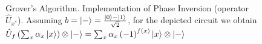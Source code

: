 \begin{figure}
\centering



\caption{Grover's Algorithm. Implementation of Phase Inversion (operator
  $\hat{U}_{x^\ast}$). Assuming 
  $b=\ket{-} = \frac{\ket{0} -
    \ket{1}}{\sqrt{2}}$, for the depicted circuit we obtain
$\hat{U}_{f}\left(\sum_x \alpha_x \ket{x}\right)\otimes\ket{-} = 
\sum_x \alpha_x
\left(-1\right)^{f\left(x\right)}\ket{x}\otimes\ket{-}$} 
\label{figQuantCompGroverPhaseInvImpl}
\end{figure}
